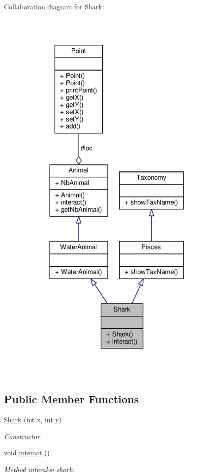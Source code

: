 Collaboration diagram for Shark\+:
\nopagebreak
\begin{figure}[H]
\begin{center}
\leavevmode
\includegraphics[width=284pt]{classShark__coll__graph}
\end{center}
\end{figure}
\subsection*{Public Member Functions}
\begin{DoxyCompactItemize}
\item 
\hyperlink{classShark_a4ea94f8c6678e7275bb84820b2944f4c}{Shark} (int x, int y)
\begin{DoxyCompactList}\small\item\em Constructor. \end{DoxyCompactList}\item 
void \hyperlink{classShark_ad643ad27db3da8fad65890bba6a1b252}{interact} ()\hypertarget{classShark_ad643ad27db3da8fad65890bba6a1b252}{}\label{classShark_ad643ad27db3da8fad65890bba6a1b252}

\begin{DoxyCompactList}\small\item\em Method interaksi shark. \end{DoxyCompactList}\end{DoxyCompactItemize}
